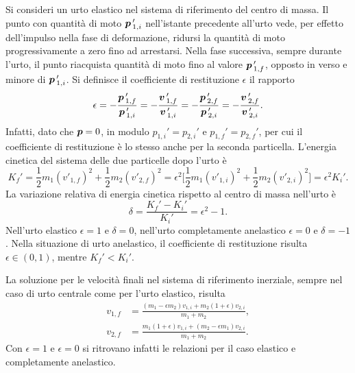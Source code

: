 Si consideri un urto elastico nel sistema di riferimento del centro di massa. Il punto con quantità di moto $\bm{p}\,'_{1,i}$ nell'istante precedente all'urto vede, per effetto dell'impulso nella fase di deformazione, ridursi la quantità di moto progressivamente a zero fino ad arrestarsi. Nella fase successiva, sempre durante l'urto, il punto riacquista quantità di moto fino al valore $\bm{p}\,'_{1,f}$, opposto in verso e minore di $\bm{p}\,'_{1,i}$. Si definisce il coefficiente di restituzione $\epsilon$ il rapporto
\begin{equation}
    \epsilon=-\frac{\bm{p}\,'_{1,f}}{\bm{p}\,'_{1,i}}=-\frac{\bm{v}\,'_{1,f}}{\bm{v}\,'_{1,i}}=-\frac{\bm{p}\,'_{2,f}}{\bm{p}\,'_{2,i}}=-\frac{\bm{v}\,'_{2,f}}{\bm{v}\,'_{2,i}}.
\end{equation}
Infatti, dato che $\bm{p}=0$, in modulo $p_{1,i}'=p_{2,i}'$ e $p_{1,f}'=p_{2,f}'$, per cui il coefficiente di restituzione è lo stesso anche per la seconda particella. L'energia cinetica del sistema delle due particelle dopo l'urto è
\begin{equation}
    K_f'=\frac{1}{2}m_1(v'_{1,f})^2+\frac{1}{2}m_2(v'_{2,f})^2=\epsilon^2\bigg[\frac{1}{2}m_1(v'_{1,i})^2+\frac{1}{2}m_2(v'_{2,i})^2\bigg]=\epsilon^2K_i'.
\end{equation}
La variazione relativa di energia cinetica rispetto al centro di massa nell'urto è
\begin{equation}
    \delta=\frac{K_f'-K_i'}{K_i'}=\epsilon^2-1.
\end{equation}
Nell'urto elastico $\epsilon=1$ e $\delta=0$, nell'urto completamente anelastico $\epsilon=0$ e $\delta=-1$. Nella situazione di urto anelastico, il coefficiente di restituzione risulta $\epsilon\in(0,1)$, mentre $K_f'<K_i'$. 

La soluzione per le velocità finali nel sistema di riferimento inerziale, sempre nel caso di urto centrale come per l'urto elastico, risulta
\begin{align}
    v_{1,f}&=\frac{(m_1-\epsilon m_2)v_{1,i}+m_2(1+\epsilon)v_{2,i}}{m_1+m_2}, \\
    v_{2,f}&=\frac{m_1(1+\epsilon)v_{1,i}+(m_2-\epsilon m_1)v_{2,i}}{m_1+m_2}.
\end{align}
Con $\epsilon=1$ e $\epsilon=0$ si ritrovano infatti le relazioni per il caso elastico e completamente anelastico. 

